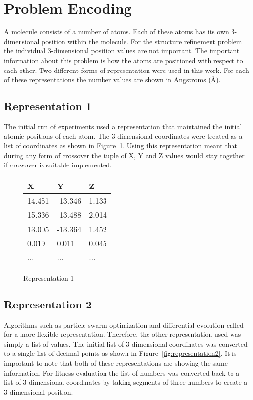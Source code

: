 \section{Problem Encoding}
\label{sec:problem-encoding}

A molecule consists of a number of atoms. Each of these atoms has its own 3-dimensional position within the molecule. For the structure refinement problem the individual 3-dimensional position values are not important. The important information about this problem is how the atoms are positioned with respect to each other. Two different forms of representation were used in this work. For each of these representations the number values are shown in Angstroms (\AA).

\subsection{Representation 1}
\label{subsec:encoding-1}

The initial run of experiments used a representation that maintained the initial atomic positions of each atom. The 3-dimensional coordinates were treated as a list of coordinates as shown in Figure~\ref{fig:representation1}. Using this representation meant that during any form of crossover the tuple of X, Y and Z values would stay together if crossover is suitable implemented.

\begin{figure}
	\centering
	\begin{tabular}{ | l | l | l | }
		\hline
		X & Y & Z \\ \hline
		14.451 & -13.346 & 1.133 \\ \hline
		15.336 & -13.488 & 2.014 \\ \hline
		13.005 & -13.364 & 1.452 \\ \hline
		0.019 & 0.011 & 0.045 \\ \hline
		... & ... & ... \\ \hline
	\end{tabular}
	\caption{Representation 1}
	\label{fig:representation1}
\end{figure}

\subsection{Representation 2}
\label{subsec:encoding-2}

Algorithms such as particle swarm optimization and differential evolution called for a more flexible representation. Therefore, the other representation used was simply a list of values. The initial list of 3-dimensional coordinates was converted to a single list of decimal points as shown in Figure~\ref{fig:representation2}. It is important to note that both of these representations are showing the same information. For fitness evaluation the list of numbers was converted back to a list of 3-dimensional coordinates by taking segments of three numbers to create a 3-dimensional position.

